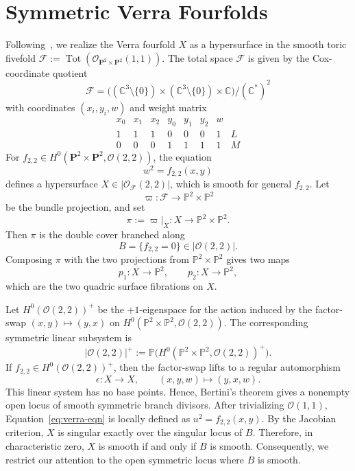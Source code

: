 \documentclass{amsart}
\theoremstyle{definition}
\theoremstyle{remark}
\newcommand{\CC}{\mathbb C}
\newcommand{\PP}{\mathbb P}
\newcommand{\OO}{\mathcal O}
\begin{document}
\section{Symmetric Verra Fourfolds}
\label{sec:verra}
Following~\cite{Coates2014QuantumPF}, we realize the Verra fourfold \(X\) as a hypersurface in the smooth toric fivefold \(\mathcal{F} := \operatorname{Tot}(\mathcal{O}_{\mathbf{P}^2 \times \mathbf{P}^2}(1,1))\). The total space \(\mathcal F\) is given by the Cox-coordinate quotient
\[
  \mathcal F = \bigl((\CC^3\setminus\{0\})\times(\CC^3\setminus\{0\})\times\CC\bigr) / (\CC^*)^2
\]
with coordinates \((x_i, y_i, w)\) and weight matrix
\begin{equation}\label{eq:weight-data}
\begin{array}{ccccccc|c}
  x_0 & x_1 & x_2 & y_0 & y_1 & y_2 & w & \\
  \hline
  1 & 1 & 1 & 0 & 0 & 0 & 1 & L \\
  0 & 0 & 0 & 1 & 1 & 1 & 1 & M
\end{array}
\end{equation}
For \(f_{2,2}\in H^0(\mathbf P^2\times\mathbf P^2,\mathcal O(2,2))\), the equation
\begin{equation}\label{eq:verra-eqn}
  w^2=f_{2,2}(x,y)
\end{equation}
defines a hypersurface
\(X\in|\mathcal O_{\mathcal F}(2,2)|\), which is smooth for general \(f_{2,2}\). Let
\[
  \varpi:\mathcal F\to \PP^2\times\PP^2
\]
be the bundle projection, and set
\[
  \pi:=\varpi|_X:X\to \PP^2\times\PP^2.
\]
Then \(\pi\) is the double cover branched along  
\[
  B=\{f_{2,2}=0\}\in |\OO(2,2)|.
\]
Composing \(\pi\) with the two projections from
\(\PP^2\times\PP^2\) gives two maps
\[
  p_1:X\to\PP^2,
  \qquad
  p_2:X\to\PP^2, 
\]
which are the two quadric surface fibrations on \(X\).

Let \(H^0(\OO(2,2))^+\) be the \(+1\)-eigenspace for the action induced by
the factor-swap \((x,y)\mapsto(y,x)\) on
\(H^0(\PP^2\times\PP^2,\OO(2,2))\). The corresponding symmetric linear subsystem is
\[
  |\OO(2,2)|^+
  :=
  \PP\bigl(H^0(\PP^2\times\PP^2,\OO(2,2))^+\bigr).
\]
If \(f_{2,2}\in H^0(\OO(2,2))^+\), then the factor-swap lifts to a regular
automorphism
\[
  \epsilon:X\longrightarrow X,
  \qquad
  (x,y,w)\longmapsto (y,x,w).
\]
This linear system has no base points. Hence, Bertini's theorem \cite[Corollary~III.10.9]{Hartshorne1977} gives a nonempty open locus of
smooth symmetric branch divisors. After trivializing $\mathcal{O}(1,1)$, Equation~\eqref{eq:verra-eqn} is locally defined as $u^2=f_{2,2}(x,y)$. By the Jacobian criterion, $X$ is singular exactly over the singular locus of $B$. Therefore, in characteristic zero, $X$ is smooth if and only if $B$ is smooth. Consequently, we restrict our attention to the open symmetric locus where $B$ is smooth.
\end{document}
